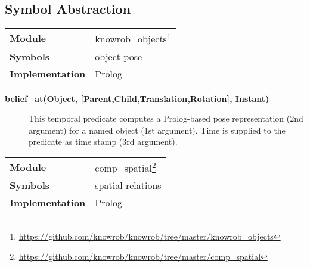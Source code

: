 \subsection{Symbol Abstraction}
\begin{center}
\begin{tabular}{ >{\ttfamily\bf}p{3.5cm} >{\ttfamily}p{8.2cm} }
\toprule
Module  & knowrob\_objects\footnote{\url{https://github.com/knowrob/knowrob/tree/master/knowrob\_objects}} \\
Symbols & object pose \\
Implementation & Prolog \\
\bottomrule
\end{tabular}
\end{center}
\begin{description}
\item[\textbf{belief\_at(Object, [Parent,Child,Translation,Rotation], Instant)}]
This temporal predicate computes a Prolog-based pose representation (2nd argument)
for a named object (1st argument). Time is supplied to the predicate as time stamp
(3rd argument).
\end{description}

\begin{center}
\begin{tabular}{ >{\ttfamily\bf}p{3.5cm} >{\ttfamily}p{8.2cm} }
\toprule
Module  & comp\_spatial\footnote{\url{https://github.com/knowrob/knowrob/tree/master/comp\_spatial}} \\
Symbols & spatial relations \\
Implementation & Prolog \\
\bottomrule
\end{tabular}
\end{center}


